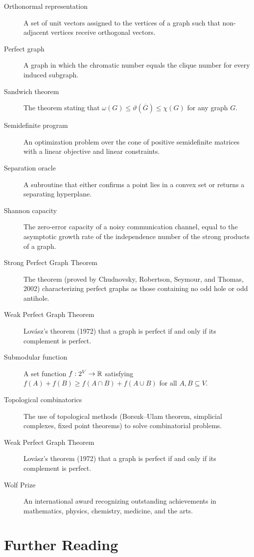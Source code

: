 \begin{description}
  \item[Orthonormal representation] A set of unit vectors assigned to the vertices of a graph such that non-adjacent vertices receive orthogonal vectors.
  \item[Perfect graph] A graph in which the chromatic number equals the clique number for every induced subgraph.
  \item[Sandwich theorem] The theorem stating that \(\omega(G) \leq \vartheta(\overline{G}) \leq \chi(G)\) for any graph \(G\).
  \item[Semidefinite program] An optimization problem over the cone of positive semidefinite matrices with a linear objective and linear constraints.
  \item[Separation oracle] A subroutine that either confirms a point lies in a convex set or returns a separating hyperplane.
  \item[Shannon capacity] The zero-error capacity of a noisy communication channel, equal to the asymptotic growth rate of the independence number of the strong products of a graph.
  \item[Strong Perfect Graph Theorem] The theorem (proved by Chudnovsky, Robertson, Seymour, and Thomas, 2002) characterizing perfect graphs as those containing no odd hole or odd antihole.
  \item[Weak Perfect Graph Theorem] Lov\'{a}sz's theorem (1972) that a graph is perfect if and only if its complement is perfect.
  \item[Submodular function] A set function \(f: 2^V \to \mathbb{R}\) satisfying \(f(A) + f(B) \geq f(A \cap B) + f(A \cup B)\) for all \(A, B \subseteq V\).
  \item[Topological combinatorics] The use of topological methods (Borsuk--Ulam theorem, simplicial complexes, fixed point theorems) to solve combinatorial problems.
  \item[Weak Perfect Graph Theorem] Lov\'{a}sz's theorem (1972) that a graph is perfect if and only if its complement is perfect.
  \item[Wolf Prize] An international award recognizing outstanding achievements in mathematics, physics, chemistry, medicine, and the arts.
\end{description}

\section*{Further Reading}

